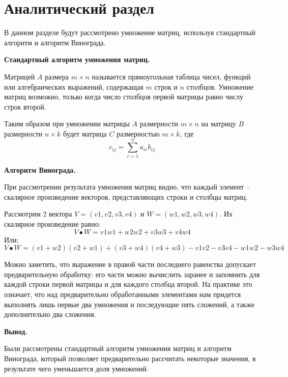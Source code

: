 \chapter{Аналитический раздел}
\label{cha:analysis}
В данном разделе будут рассмотрено умножение матриц, используя стандартный алгоритм и алгоритм Винограда.
\par\textbf{Стандартный алгоритм умножения матриц.}
\par Матрицей $A$ размера $m\times n$ называется прямоугольная таблица чисел, функций или алгебраических выражений, содержащая $m$ строк и $n$ столбцов. \cite{Belousov} Умножение матриц возможно, только когда число столбцов первой матрицы равно числу строк второй.
\par Таким образом при умножении матрицы $A$ размерности $m \times n$ на матрицу $B$ размерности $n \times k$ будет матрица $C$ размерностью $m \times k$, где
\begin{equation}
	c_{ij} = \sum\limits_{r=1}^{n}a_{ir}b_{rj}
\end{equation}


\par\textbf{Алгоритм Винограда.}
\par При рассмотрении результата умножения матриц видно, что каждый элемент -- скалярное произведение векторов, представляющих строки и столбцы матриц. \cite{winograd}
\par Рассмотрим 2 вектора $V = (v1, v2, v3, v4)$ и $W =(w1,w2,w3,w4)$. Их скалярное произведение равно:
\begin{equation}
V\bullet W=v1w1+w2w2+v3w3+v4w4
\end{equation}
Или:
\begin{equation}
V\bullet W=(v1+w2)(v2+w1)+(v3+w4)(v4+w3)-v1v2-v3v4-w1w2-w3w4
\end{equation}
\par Можно заметить, что выражение в правой части последнего равенства допускает предварительную обработку: его части можно вычислить заранее и запомнить для каждой строки первой матрицы и для каждого столбца второй. На практике это означает, что над предварительно обработанными элементами нам придется выполнять лишь первые два умножения и последующие пять сложений, а также дополнительно два сложения.
\par\textbf{Вывод.} 
\par Были рассмотрены стандартный алгоритм умножения матриц и алгоритм Винограда, который позволяет предварительно рассчитать некоторые значения, в результате чего уменьшается доля умножений.